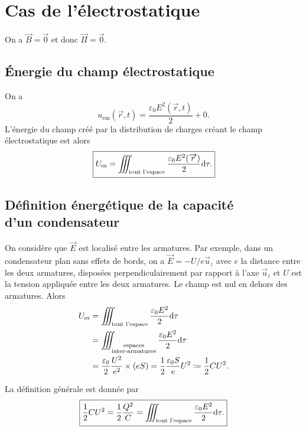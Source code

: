 \section{Cas de l'électrostatique}

On a $\vec{B}=\vec{0}$ et donc $\vec{\Pi}=\vec{0}$.

\subsection{Énergie du champ électrostatique}

On a 
\begin{equation}
    \boxed{
        u_{\mathrm{em}}(\vec{r},t)=\frac{\varepsilon_0 E^{2}(\vec{r},t)}{2}+0.
    }
\end{equation}
L'énergie du champ créé par la distribution de charges créant le champ électrostatique est alors 
\begin{equation}
    \boxed{
        U_{\mathrm{es}}=\iiint_{\text{tout l'espace}}\frac{\varepsilon_0 E^{2}(\protect\overrightarrow{{r}})}{2}\mathrm{d}\tau.
    }
\end{equation}

\subsection{Définition énergétique de la capacité\texorpdfstring{\\}{ }d'un condensateur}

On considère que $\vec{E}$ est localisé entre les armatures. Par exemple, dans un condensateur plan sans effets de bords, on a $\vec{E}=-U/e\vec{u}_z$ avec $e$ la distance entre les deux armatures, disposées perpendiculairement par rapport à l'axe $\vec{u}_z$ et $U$ est la tension appliquée entre les deux armatures. Le champ est nul en dehors des armatures. Alors
\begin{align}
    U_{\mathrm{es}}
    &=
    \iiint_{\text{tout l'espace}}\frac{\varepsilon_0 E^{2}}{2}\mathrm{d}\tau\\
    &=
    \iiint_{\substack{\text{espaces}\\\text{inter-armatures}}}\frac{\varepsilon_0 E^{2}}{2}\mathrm{d}\tau\\
    &=
    \frac{\varepsilon_0}{2}\frac{U^{2}}{e^{2}}\times(e S)=\frac{1}{2}\frac{\varepsilon_0 S}{e}U^{2}\coloneqq\frac{1}{2}C U^{2}.
\end{align}

La définition générale est donnée par
\begin{equation}
    \boxed{
        \frac{1}{2}CU^{2}=\frac{1}{2}\frac{Q^{2}}{C}=\iiint_{\text{tout l'espace}}\frac{\varepsilon_0 E^{2}}{2}\mathrm{d}\tau.
    }
\end{equation}